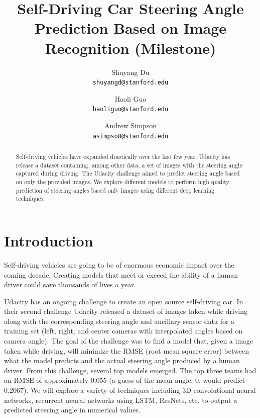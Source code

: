 \documentclass[10pt,twocolumn,letterpaper]{article}
\begin{document}
\title{Self-Driving Car Steering Angle Prediction Based on Image Recognition (Milestone)}

\author{Shuyang Du\\
{\tt\small shuyangd@stanford.edu}
\and
Haoli Guo\\
{\tt\small haoliguo@stanford.edu}
\and
Andrew Simpson\\
{\tt\small asimpso8@stanford.edu}
}

\maketitle

\begin{abstract}
   Self-driving vehicles have expanded drastically over the last few year. Udacity has release a dataset containing, among other data, a set of images with the steering angle captured during driving. The Udacity challenge aimed to predict steering angle based on only the provided images. We explore different models to perform high quality prediction of steering angles based only images using different deep learning techniques.
\end{abstract}

\section{Introduction}
Self-driving vehicles are going to be of enormous economic impact over the coming decade. Creating models that meet or exceed the ability of a human driver could save thousands of lives a year. 

Udacity has an ongoing challenge to create an open source self-driving car. In their second challenge Udacity released a dataset of images taken while driving along with the corresponding steering angle and ancillary sensor data for a training set (left, right, and center cameras with interpolated angles based on camera angle). The goal of the challenge was to find a model that, given a image taken while driving, will minimize the RMSE (root mean square error) between what the model predicts and the actual steering angle produced by a human driver. From this challenge, several top models emerged. The top three teams had an RMSE of approximately 0.055 (a guess of the mean angle, 0, would predict 0.2067). We will explore a variety of techniques including 3D convolutional neural networks, recurrent neural networks using LSTM, ResNets, etc. to output a predicted steering angle in numerical values. 
\end{document}
